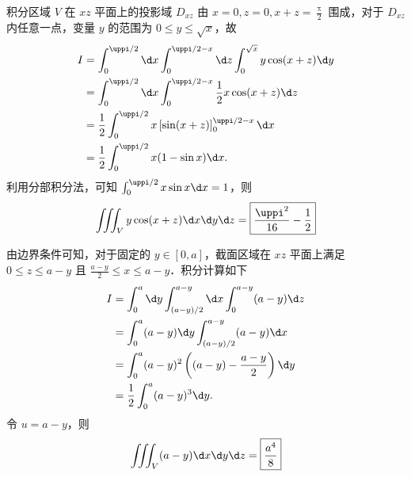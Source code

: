 \begin{solution}
    积分区域 $V$ 在 $xz$ 平面上的投影域 $D_{xz}$ 由 $x=0, z=0, x+z=\frac{\uppi}{2}$ 围成，对于 $D_{xz}$ 内任意一点，变量 $y$ 的范围为 $0 \le y \le \sqrt{x}$，故
    \begin{equation}
        \begin{aligned}
            I & = \int_0^{\uppi/2} \d x \int_0^{\uppi/2 - x} \d z \int_0^{\sqrt{x}} y \cos(x + z) \d y \\
              & = \int_0^{\uppi/2} \d x \int_0^{\uppi/2 - x} \frac{1}{2}x \cos(x + z) \d z             \\
              & = \frac{1}{2} \int_0^{\uppi/2} x \left[ \sin(x + z) \right]_0^{\uppi/2 - x} \d x       \\
              & = \frac{1}{2} \int_0^{\uppi/2} x (1 - \sin x) \d x.
        \end{aligned}
    \end{equation}
    利用分部积分法，可知 $\int_0^{\uppi/2} x \sin x \d x = 1$，则
    \begin{equation}
        \iiint_V y \cos(x + z) \d x \d y \d z = \boxed{\frac{\uppi^2}{16} - \frac{1}{2}}
    \end{equation}

    由边界条件可知，对于固定的 $y \in [0, a]$，截面区域在 $xz$ 平面上满足 $0 \le z \le a - y$ 且 $\frac{a-y}{2} \le x \le a - y$．积分计算如下
    \begin{equation}
        \begin{aligned}
            I & = \int_0^a \d y \int_{(a-y)/2}^{a-y} \d x \int_0^{a-y} (a-y) \d z \\
              & = \int_0^a (a-y) \d y \int_{(a-y)/2}^{a-y} (a-y) \d x             \\
              & = \int_0^a (a-y)^2 \left( (a-y) - \frac{a-y}{2} \right) \d y      \\
              & = \frac{1}{2} \int_0^a (a-y)^3 \d y.
        \end{aligned}
    \end{equation}
    令 $u = a - y$，则
    \begin{equation}
        \iiint_V (a - y) \d x \d y \d z = \boxed{\frac{a^4}{8}}
    \end{equation}
\end{solution}

